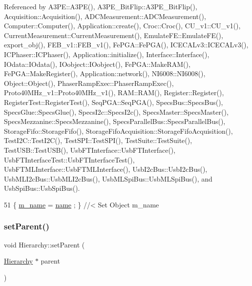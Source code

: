 Referenced by A3\+P\+E\+::\+A3\+P\+E(), A3\+P\+E\+\_\+\+Bit\+Flip\+::\+A3\+P\+E\+\_\+\+Bit\+Flip(), Acquisition\+::\+Acquisition(), A\+D\+C\+Measurement\+::\+A\+D\+C\+Measurement(), Computer\+::\+Computer(), Application\+::create(), Croc\+::\+Croc(), C\+U\+\_\+v1\+::\+C\+U\+\_\+v1(), Current\+Measurement\+::\+Current\+Measurement(), Emulate\+F\+E\+::\+Emulate\+F\+E(), export\+\_\+obj(), F\+E\+B\+\_\+v1\+::\+F\+E\+B\+\_\+v1(), Fe\+P\+G\+A\+::\+Fe\+P\+G\+A(), I\+C\+E\+C\+A\+Lv3\+::\+I\+C\+E\+C\+A\+Lv3(), I\+C\+Phaser\+::\+I\+C\+Phaser(), Application\+::initialize(), Interface\+::\+Interface(), I\+Odata\+::\+I\+Odata(), I\+Oobject\+::\+I\+Oobject(), Fe\+P\+G\+A\+::\+Make\+R\+A\+M(), Fe\+P\+G\+A\+::\+Make\+Register(), Application\+::network(), N\+I6008\+::\+N\+I6008(), Object\+::\+Object(), Phaser\+Ramp\+Exec\+::\+Phaser\+Ramp\+Exec(), Proto40\+M\+Hz\+\_\+v1\+::\+Proto40\+M\+Hz\+\_\+v1(), R\+A\+M\+::\+R\+A\+M(), Register\+::\+Register(), Register\+Test\+::\+Register\+Test(), Seq\+P\+G\+A\+::\+Seq\+P\+G\+A(), Specs\+Bus\+::\+Specs\+Bus(), Specs\+Glue\+::\+Specs\+Glue(), Specs\+I2c\+::\+Specs\+I2c(), Specs\+Master\+::\+Specs\+Master(), Specs\+Mezzanine\+::\+Specs\+Mezzanine(), Specs\+Parallel\+Bus\+::\+Specs\+Parallel\+Bus(), Storage\+Fifo\+::\+Storage\+Fifo(), Storage\+Fifo\+Acquisition\+::\+Storage\+Fifo\+Acquisition(), Test\+I2\+C\+::\+Test\+I2\+C(), Test\+S\+P\+I\+::\+Test\+S\+P\+I(), Test\+Suite\+::\+Test\+Suite(), Test\+U\+S\+B\+::\+Test\+U\+S\+B(), Usb\+F\+T\+Interface\+::\+Usb\+F\+T\+Interface(), Usb\+F\+T\+Interface\+Test\+::\+Usb\+F\+T\+Interface\+Test(), Usb\+F\+T\+M\+L\+Interface\+::\+Usb\+F\+T\+M\+L\+Interface(), Usb\+I2c\+Bus\+::\+Usb\+I2c\+Bus(), Usb\+M\+L\+I2c\+Bus\+::\+Usb\+M\+L\+I2c\+Bus(), Usb\+M\+L\+Spi\+Bus\+::\+Usb\+M\+L\+Spi\+Bus(), and Usb\+Spi\+Bus\+::\+Usb\+Spi\+Bus().


\begin{DoxyCode}
51 \{ \hyperlink{classObject_a8b83c95c705d2c3ba0d081fe1710f48d}{m\_name}  = \hyperlink{classObject_a300f4c05dd468c7bb8b3c968868443c1}{name}  ; \} \textcolor{comment}{//< Set Object m\_name}
\end{DoxyCode}
\mbox{\label{classHierarchy_a585ad1aeec16077a0e532ab8b4fc557b}} 
\subsubsection{\texorpdfstring{set\+Parent()}{setParent()}}
{\footnotesize\ttfamily void Hierarchy\+::set\+Parent (\begin{DoxyParamCaption}\item[{\hyperlink{classHierarchy}{Hierarchy} $\ast$}]{parent }\end{DoxyParamCaption})\hspace{0.3cm}{\ttfamily [inherited]}}



